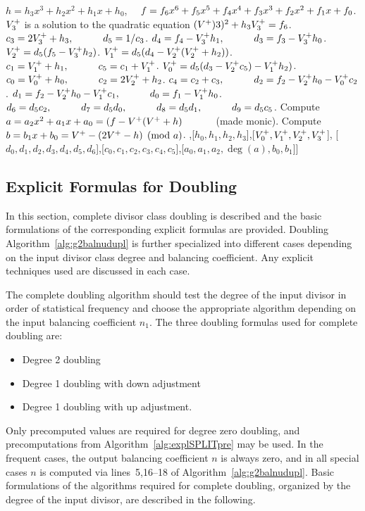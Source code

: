 \begin{algorithm}[htbp]
\caption{Genus 2 Split Model Precomputation\label{alg:explSPLITpre}}
\begin{algorithmic} [1]
\Require $h = h_3x^3 + h_2x^2 + h_1x + h_0$, $\quad f = f_6x^6 + f_5x^5 + f_4x^4 + f_3x^3 + f_2x^2 + f_1x + f_0$.
\algrule
\State $V^{+}_3$ is a solution to the quadratic equation $(V^{+})3)^2  + h_3V^{+}_3 = f_6$.
\State $c_3 = 2V^{+}_3 + h_3, \quad\quad\quad d_5 = 1/c_3$.
\State $d_4 = f_4 - V^{+}_3h_1, \quad\quad\quad d_3 = f_3 - V^{+}_3h_0$.
\State $V^{+}_2 =  d_5(f_5 - V^{+}_3h_2)$.
\State $V^{+}_1 =  d_5(d_4- V^{+}_2(V^{+}_2 + h_2))$.
\State $c_1 = V^{+}_1 + h_1, \quad\quad\quad c_5 = c_1 + V^{+}_1$.
\State $V^{+}_0 =  d_5(d_3 - V^{+}_2c_5) - V^{+}_1h_2)$.
\State $c_0 = V^{+}_0 + h_0, \quad\quad\quad c_2 = 2V^{+}_2 + h_2$.
\State $c_4 = c_2 + c_3, \quad\quad\quad d_2 = f_2 - V^{+}_2h_0 - V^{+}_0c_2$.
\State $d_1 = f_2 - V^{+}_2h_0 - V^{+}_1c_1, \quad\quad\quad d_0 = f_1 - V^{+}_1h_0$.
\State $d_6 = d_5c_2, \quad\quad\quad d_7 = d_5d_0, \quad\quad\quad d_8 = d_5d_1, \quad\quad\quad d_9 = d_5c_5$.
\State Compute $a = a_2x^2 + a_1x + a_0 = (f - V^{+}(V^{+} +  h) \quad\quad\quad$ (made monic).
\State Compute $b = b_1x + b_0 = V^{+} - (2V^{+} - h) \pmod{a}$.
\State \Return [[$f_0,f_1,f_2,f_3,f_4,f_5,f_6$],[$h_0,h_1,h_2,h_3$],[$V^{+}_0,V^{+}_1,V^{+}_2,V^{+}_3$],
\Statex \hspace{37pt} [$d_0,d_1,d_2,d_3,d_4,d_5,d_6$],[$c_0,c_1,c_2,c_3,c_4,c_5$],[$a_0,a_1,a_2,\deg(a),b_0,b_1$]]
\end{algorithmic}
\end{algorithm}


\subsection{Explicit Formulas for Doubling}\label{sec:g2SPLITDBL}
In this section, complete divisor class doubling is described and the basic
formulations of the corresponding explicit formulas are provided. Doubling
Algorithm~\ref{alg:g2balnudupl} is further specialized into different cases
depending on the input divisor class degree and balancing coefficient. Any
explicit techniques used are discussed in each case. 

The complete doubling algorithm should test the degree of the input divisor in
order of statistical frequency and choose the appropriate algorithm depending on
the input balancing coefficient $n_1$. The three doubling formulas used for complete doubling are:
\begin{itemize}
    \item Degree 2 doubling
    \item Degree 1 doubling with down adjustment
    \item Degree 1 doubling with up adjustment. 
\end{itemize}  
Only precomputed values are required for degree zero doubling, and
precomputations from Algorithm~\ref{alg:explSPLITpre} may be used. In the
frequent cases, the output balancing coefficient $n$ is always zero, and in all
special cases $n$ is computed via lines~5,16--18 of
Algorithm~\ref{alg:g2balnudupl}. Basic formulations of the algorithms required
for complete doubling, organized by the degree of the input divisor, are
described in the following.


